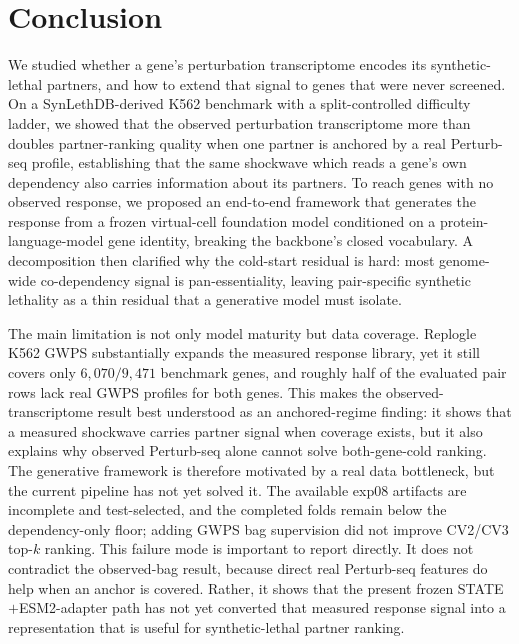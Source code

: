\section{Conclusion}
\label{sec:conclusion}

We studied whether a gene's perturbation transcriptome encodes its
synthetic-lethal partners, and how to extend that signal to genes that were never
screened. On a SynLethDB-derived K562 benchmark with a split-controlled
difficulty ladder, we showed that the observed perturbation transcriptome more
than doubles partner-ranking quality when one partner is anchored by a real
Perturb-seq profile, establishing that the same shockwave which reads a gene's own
dependency also carries information about its partners. To reach genes with no
observed response, we proposed an end-to-end framework that generates the response
from a frozen virtual-cell foundation model conditioned on a protein-language-model
gene identity, breaking the backbone's closed vocabulary. A decomposition then
clarified why the cold-start residual is hard: most genome-wide co-dependency
signal is pan-essentiality, leaving pair-specific synthetic lethality as a thin
residual that a generative model must isolate.

The main limitation is not only model maturity but data coverage. Replogle K562
GWPS substantially expands the measured response library, yet it still covers
only $6{,}070/9{,}471$ benchmark genes, and roughly half of the evaluated pair
rows lack real GWPS profiles for both genes. This makes the observed-transcriptome
result best understood as an anchored-regime finding: it shows that a measured
shockwave carries partner signal when coverage exists, but it also explains why
observed Perturb-seq alone cannot solve both-gene-cold ranking. The generative
framework is therefore motivated by a real data bottleneck, but the current
pipeline has not yet solved it. The available exp08 artifacts are incomplete and
test-selected, and the completed folds remain below the dependency-only floor;
adding GWPS bag supervision did not improve CV2/CV3 top-$k$ ranking. This failure
mode is important to report directly. It does not contradict the observed-bag
result, because direct real Perturb-seq features do help when an anchor is
covered. Rather, it shows that the present frozen STATE${+}$ESM2-adapter path has
not yet converted that measured response signal into a representation that is
useful for synthetic-lethal partner ranking.

